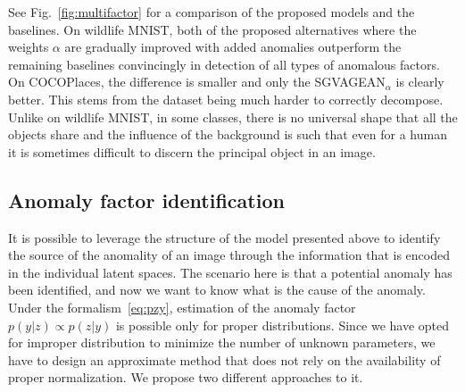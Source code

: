 See Fig.~\ref{fig:multifactor} for a comparison of the proposed models and the baselines. On wildlife MNIST, both of the proposed alternatives where the weights $\alpha$ are gradually improved with added anomalies outperform the remaining baselines convincingly in detection of all types of anomalous factors. On COCOPlaces, the difference is smaller and only the SGVAGEAN$_{\alpha}$ is clearly better. This stems from the dataset being much harder to correctly decompose. Unlike on wildlife MNIST, in some classes, there is no universal shape that all the objects share and the influence of the background is such that even for a human it is sometimes difficult to discern the principal object in an image. 

\subsection{Anomaly factor identification} \label{sec:anomaly_factor_identification}
It is possible to leverage the structure of the model presented above to identify the source of the anomality of an image through the information that is encoded in the individual latent spaces. The scenario here is that a potential anomaly has been identified, and now we want to know what is the cause of the anomaly. Under the formalism~\eqref{eq:pzy}, estimation of the anomaly factor  $p(y \vert z)\propto p(z \vert y)$ is possible only for proper distributions. Since we have opted for improper distribution to minimize the number of unknown parameters, we have to design an approximate method that does not rely on the availability of proper normalization. We propose two different approaches to it.

